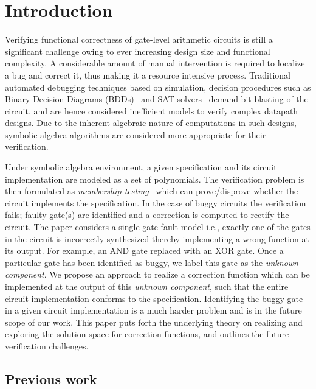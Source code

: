 \section{Introduction}
Verifying functional correctness of gate-level arithmetic circuits is still a significant challenge owing to ever increasing design size and functional complexity. A considerable amount of manual intervention is required to localize a bug and correct it, thus making it a resource intensive process. Traditional automated debugging techniques based on simulation, decision procedures such as Binary Decision Diagrams (BDDs)~\cite{bryant:1} and SAT solvers~\cite{alanmi:2006} demand bit-blasting of the circuit, and are hence considered inefficient models to verify complex datapath designs. Due to the inherent algebraic nature of computations in such designs, symbolic algebra algorithms are considered more appropriate for their verification.

Under symbolic algebra environment, a given specification and its circuit implementation are modeled as a set of polynomials. The verification problem is then formulated as \textit{membership testing}~\cite{gb_book} which can prove/disprove whether the circuit implements the specification. In the case of buggy circuits the verification fails; faulty gate(s) are identified and a correction is computed to rectify the circuit. The paper considers a single gate fault model i.e., exactly one of the gates in the circuit is incorrectly synthesized thereby implementing a wrong function at its output. For example, an AND gate replaced with an XOR gate. Once a particular gate has been identified as buggy, we label this gate as the \textit{unknown component}. We propose an approach to realize a correction function which can be implemented at the output of this \textit{unknown component}, such that the entire circuit implementation conforms to the specification. Identifying the buggy gate in a given circuit implementation is a much harder problem and is in the future scope of our work. This paper puts forth the underlying theory on realizing and exploring the solution space for correction functions, and outlines the future verification challenges.
\vspace{-0.1in}
\subsection{Previous work}

